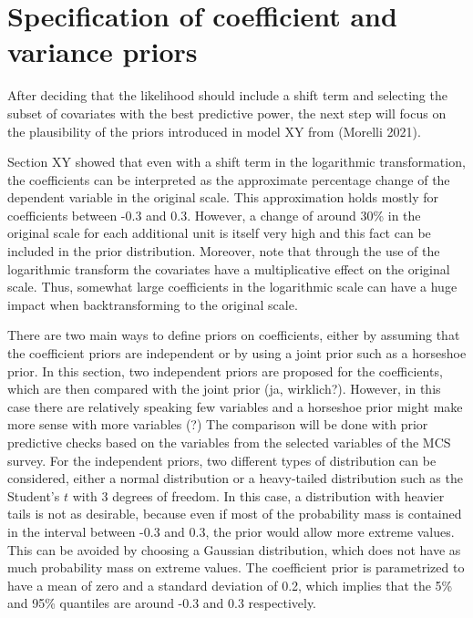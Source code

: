 \section{Specification of coefficient and variance priors}
\label{ch:coef_var_spec}

After deciding that the likelihood should include a shift term and selecting the subset of covariates with the best predictive power, the next step will focus on the plausibility of the priors introduced in model XY from (Morelli 2021).

Section XY showed that even with a shift term in the logarithmic transformation, the coefficients can be interpreted as the approximate percentage change of the dependent variable in the original scale.
This approximation holds mostly for coefficients between -0.3 and 0.3.
However, a change of around 30\% in the original scale for each additional unit is itself very high and this fact can be included in the prior distribution.
Moreover, note that through the use of the logarithmic transform the covariates have a multiplicative effect on the original scale.
Thus, somewhat large coefficients in the logarithmic scale can have a huge impact when backtransforming to the original scale.

There are two main ways to define priors on coefficients, either by assuming that the coefficient priors are independent or by using a joint prior such as a horseshoe prior.
In this section, two independent priors are proposed for the coefficients, which are then compared with the joint prior (ja, wirklich?). However, in this case there are relatively speaking few variables and a horseshoe prior might make more sense with more variables (?)
The comparison will be done with prior predictive checks based on the variables from the selected variables of the MCS survey.
For the independent priors, two different types of distribution can be considered, either a normal distribution or a heavy-tailed distribution such as the Student's $t$ with 3 degrees of freedom.
In this case, a distribution with heavier tails is not as desirable, because even if most of the probability mass is contained in the interval between -0.3 and 0.3, the prior would allow more extreme values.
This can be avoided by choosing a Gaussian distribution, which does not have as much probability mass on extreme values.
The coefficient prior is parametrized to have a mean of zero and a standard deviation of 0.2, which implies that the 5\% and 95\% quantiles are around -0.3 and 0.3 respectively.

